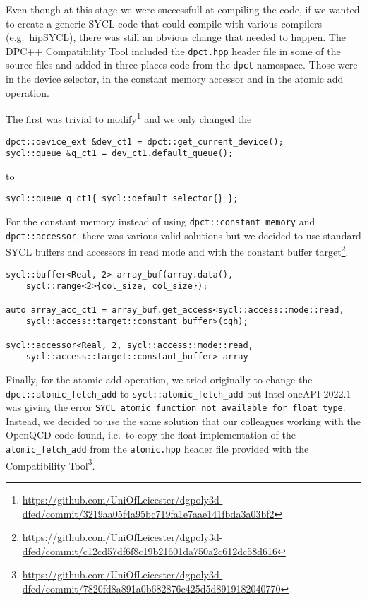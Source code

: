 \documentclass[../main]{subfiles}
\begin{document}
Even though at this stage we were successfull at compiling the code, if we wanted to create a generic SYCL code that could compile with various compilers (e.g.\ hipSYCL), there was still an obvious change that needed to happen.
The DPC++ Compatibility Tool included the \texttt{dpct.hpp} header file in some of the source files and added in three places code from the \texttt{dpct} namespace.
Those were in the device selector, in the constant memory accessor and in the atomic add operation.

The first was trivial to modify\footnote{\url{https://github.com/UniOfLeicester/dgpoly3d-dfed/commit/3219aa05f4a95bc719fa1e7aae141fbda3a03bf2}} and we only changed the
\begin{verbatim}
dpct::device_ext &dev_ct1 = dpct::get_current_device();
sycl::queue &q_ct1 = dev_ct1.default_queue();
\end{verbatim}
to
\begin{verbatim}
sycl::queue q_ct1{ sycl::default_selector{} };
\end{verbatim}

For the constant memory instead of using \texttt{dpct::constant\_memory} and \texttt{dpct::accessor}, there was various valid solutions but we decided to use standard SYCL buffers and accessors in read mode and with the constant buffer target\footnote{\url{https://github.com/UniOfLeicester/dgpoly3d-dfed/commit/c12cd57df6f8c19b21601da750a2c612dc58d616}}.
\begin{verbatim}
sycl::buffer<Real, 2> array_buf(array.data(),
    sycl::range<2>{col_size, col_size});

auto array_acc_ct1 = array_buf.get_access<sycl::access::mode::read,
    sycl::access::target::constant_buffer>(cgh);

sycl::accessor<Real, 2, sycl::access::mode::read,
    sycl::access::target::constant_buffer> array
\end{verbatim}

Finally, for the atomic add operation, we tried originally to change the \texttt{dpct::atomic\_fetch\_add} to \texttt{sycl::atomic\_fetch\_add} but Intel oneAPI 2022.1 was giving the error \texttt{SYCL atomic function not available for float type}.
Instead, we decided to use the same solution that our colleagues working with the OpenQCD code found, i.e.\ to copy the float implementation of the \texttt{atomic\_fetch\_add} from the \texttt{atomic.hpp} header file provided with the Compatibility Tool\footnote{\url{https://github.com/UniOfLeicester/dgpoly3d-dfed/commit/7820fd8a891a0b682876c425d5d8919182040770}}.
\end{document}
